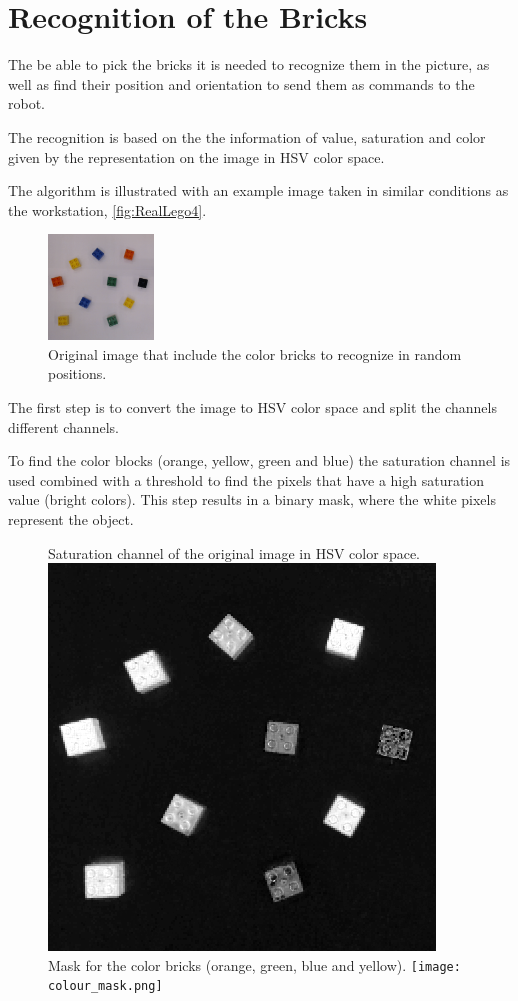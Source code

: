 \section{Recognition of the Bricks}
The be able to pick the bricks it is needed to recognize them in the picture, as well as find their position and orientation to send them as commands to the robot.

The recognition is based on the the information of value, saturation and color given by the representation on the image in HSV color space.

The algorithm is illustrated with an example image taken in similar conditions as the workstation, \autoref{fig:RealLego4}.

\begin{figure}[H]
    \includegraphics[width=0.25\textwidth]{figures/original.png}
    \caption{Original image that include the color bricks to recognize in random positions.}
    \label{fig:RealLego4}
\end{figure}

The first step is to convert the image to HSV color space and split the channels different channels.

To find the color blocks (orange, yellow, green and blue) the saturation channel is used combined with a threshold to find the pixels that have a high saturation value (bright colors). This step results in a binary mask, where the white pixels represent the object.

\begin{figure}[H]
    \captionbox  %
    { 
        Saturation channel of the original image in HSV color space.              
        \label{fig:saturation}                                  
    }                                                                 
    {                                                                  
        \includegraphics[width=.25\textwidth]{figures/saturation.png}         
    }                                                                    
    \hspace{5pt}                                                          
    \captionbox
    {      
        Mask for the color bricks (orange, green, blue and yellow). 
        \label{fig:colour_mask}                                     
    }
    {
        \texttt{[image: colour\_mask.png]}            
    }                                                                             
\end{figure}

